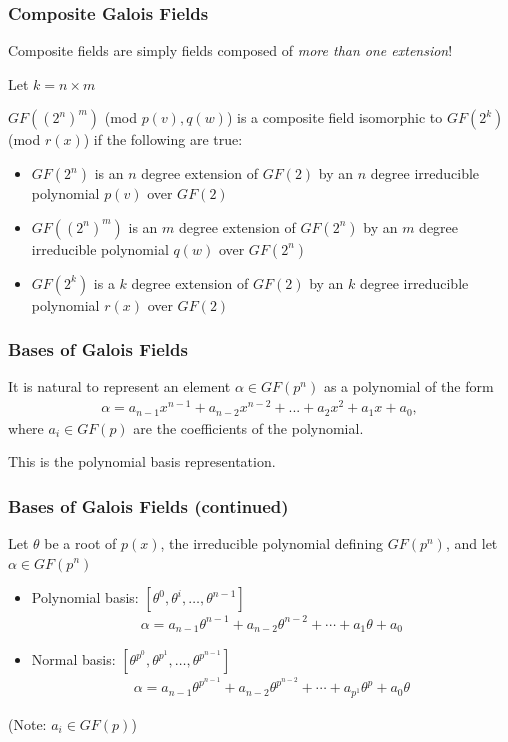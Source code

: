 \documentclass[handout,10pt]{beamer}
\begin{document}
\begin{frame}
	\frametitle{Composite Galois Fields}
	Composite fields are simply fields composed of \emph{more than one extension}!

	\medskip

	Let $k = n \times m$

	\medskip

	$GF((2^n)^m)$ (mod $p(v), q(w)$) is a composite field isomorphic to $GF(2^k)$ (mod $r(x)$) if the following are true:
	\begin{itemize}
		\item $GF(2^n)$ is an $n$ degree extension of $GF(2)$ by an $n$ degree irreducible polynomial $p(v)$ over $GF(2)$
		\item $GF((2^n)^m)$ is an $m$ degree extension of $GF(2^n)$ by an $m$ degree irreducible polynomial $q(w)$ over $GF(2^n)$
		\item $GF(2^k)$ is a $k$ degree extension of $GF(2)$ by an $k$ degree irreducible polynomial $r(x)$ over $GF(2)$
	\end{itemize}
\end{frame}

\begin{frame}
	\frametitle{Bases of Galois Fields}
It is natural to represent an element $\alpha \in GF(p^n)$ as a polynomial of the form
\begin{align*}
\alpha = a_{n-1}x^{n-1} + a_{n-2}x^{n-2} + ... + a_2x^2 + a_1x + a_0,
\end{align*}
where $a_i \in GF(p)$ are the coefficients of the polynomial. 
\pause
\begin{center}
This is the polynomial basis representation.
\end{center}
\end{frame}

\begin{frame}
	\frametitle{Bases of Galois Fields (continued)}
	Let $\theta$ be a root of $p(x)$, the irreducible polynomial defining $GF(p^n)$, and let $\alpha \in GF(p^n)$
	\pause
	\begin{itemize}
		\item Polynomial basis: $[\theta^0,\theta^i,\dots,\theta^{n-1}]$
		\begin{align*}
			\alpha = a_{n-1}\theta^{n-1} + a_{n-2}\theta^{n-2} + \dotsb + a_{1}\theta + a_0
		\end{align*}
		\pause
		\item Normal basis: $[\theta^{p^{0}},\theta^{p^{1}},\dots,\theta^{p^{n-1}}]$
		\begin{align*}
			\alpha = a_{n-1}\theta^{p^{n-1}} + a_{n-2}\theta^{p^{n-2}} + \dotsb + a_{p^{1}}\theta^{p} + a_0\theta
		\end{align*}
	\end{itemize}

	\medskip 
	\begin{center}
		(Note: $a_i \in GF(p)$)
	\end{center}
\end{frame}
\end{document}
